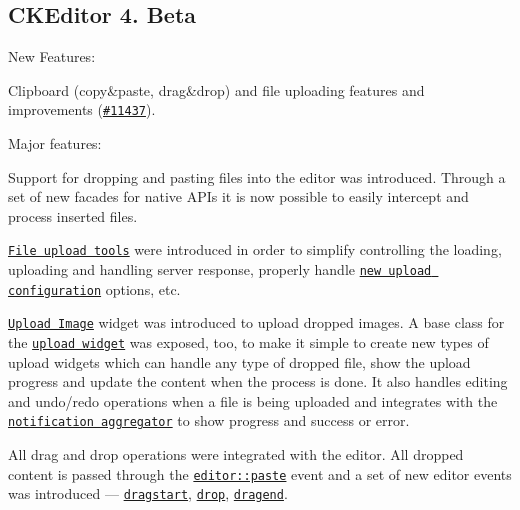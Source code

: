 \subsection*{C\+K\+Editor 4. Beta}

New Features\+:


\begin{DoxyItemize}
\item Clipboard (copy\&paste, drag\&drop) and file uploading features and improvements (\href{http://dev.ckeditor.com/ticket/11437}{\tt \#11437}).
\begin{DoxyItemize}
\item Major features\+:
\begin{DoxyItemize}
\item Support for dropping and pasting files into the editor was introduced. Through a set of new facades for native A\+P\+Is it is now possible to easily intercept and process inserted files.
\item \href{http://docs.ckeditor.com/#!/api/CKEDITOR.fileTools}{\tt File upload tools} were introduced in order to simplify controlling the loading, uploading and handling server response, properly handle \href{http://docs.ckeditor.com/#!/api/CKEDITOR.config-cfg-uploadUrl}{\tt new upload configuration} options, etc.
\item \href{http://ckeditor.com/addon/uploadimage}{\tt Upload Image} widget was introduced to upload dropped images. A base class for the \href{http://docs.ckeditor.com/#!/api/CKEDITOR.fileTools.uploadWidgetDefinition}{\tt upload widget} was exposed, too, to make it simple to create new types of upload widgets which can handle any type of dropped file, show the upload progress and update the content when the process is done. It also handles editing and undo/redo operations when a file is being uploaded and integrates with the \href{http://docs.ckeditor.com/#!/api/CKEDITOR.plugins.notificationAggregator}{\tt notification aggregator} to show progress and success or error.
\item All drag and drop operations were integrated with the editor. All dropped content is passed through the \href{http://docs.ckeditor.com/#!/api/CKEDITOR.editor-event-paste}{\tt {\ttfamily editor\+::paste}} event and a set of new editor events was introduced --- \href{http://docs.ckeditor.com/#!/api/CKEDITOR.editor-event-dragstart}{\tt {\ttfamily dragstart}}, \href{http://docs.ckeditor.com/#!/api/CKEDITOR.editor-event-drop}{\tt {\ttfamily drop}}, \href{http://docs.ckeditor.com/#!/api/CKEDITOR.editor-event-dragend}{\tt {\ttfamily dragend}}.

\end{DoxyItemize}
\end{DoxyItemize}
\end{DoxyItemize}
